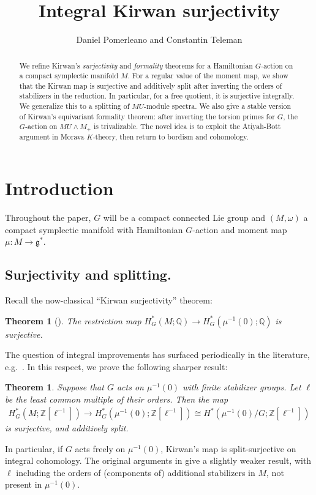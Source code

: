 \documentclass[11pt, reqno]{amsart}
\title{Integral Kirwan surjectivity}
\author{Daniel Pomerleano and Constantin Teleman}
\theoremstyle{plain}
\newtheorem{thm}{Theorem}[section]
\newtheorem*{thm*}{Theorem}
\theoremstyle{definition}
\begin{document}
\begin{abstract} We refine Kirwan's \emph{surjectivity} and \emph{formality} theorems for a Hamiltonian 
$G$-action on a compact symplectic manifold $M$. For a regular value of the 
moment map, we show that the Kirwan map is surjective and additively split after inverting the orders of 
stabilizers in the reduction.  In particular, for a free quotient, it is surjective integrally. We  generalize 
this to a splitting of $MU$-module spectra. We also give a stable version of Kirwan's equivariant formality 
theorem: after inverting the torsion primes for $G$, the $G$-action on $MU\wedge M_+$ is trivalizable. 
The novel idea is to exploit the Atiyah-Bott argument in Morava $K$-theory, then return to bordism and 
cohomology.
   \end{abstract}
\maketitle

\section{Introduction} 

Throughout the paper, $G$ will be a compact connected Lie group and $(M,\omega)$ a compact symplectic manifold 
with Hamiltonian $G$-action and moment map $\mu: M \to \mathfrak{g}^*$. 
\subsection{Surjectivity and splitting.}
Recall the now-classical ``Kirwan surjectivity'' theorem: 

\begin{thm*} [\mbox{\cite[\S5]{Kirwan}}]\label{thm:Kirwan} 
The restriction map 
$H^*_G(M; \mathbb{Q}) \to  H_G^*(\mu^{-1}(0); \mathbb{Q})$ is surjective.   
\end{thm*} 
\noindent
The question of integral improvements has surfaced periodically in the literature, e.g.~\cite{tw, aim}.
In this respect, we prove the following sharper result:

\begin{thm} \label{thm:main} 
Suppose that $G$ acts on $\mu^{-1}(0)$ with finite stabilizer groups.  Let $\ell$ be the least common multiple of 
their orders.  Then the map 
\begin{align} 
H^*_G(M; \mathbb{Z}[\ell^{-1}]) \to H_G^*(\mu^{-1}(0); \mathbb{Z}[\ell^{-1}]) \cong 
H^*(\mu^{-1}(0)/G; \mathbb{Z}[\ell^{-1}]) 
\end{align} 
is surjective, and additively split.   
\end{thm} 
\noindent
In particular,  if $G$ acts freely on $\mu^{-1}(0)$,  Kirwan's map is split-surjective on integral cohomology. 
The original arguments in \cite{Kirwan} give a slightly weaker result, with $\ell$ including the orders of 
(components of) additional stabilizers in $M$, not present in $\mu^{-1}(0)$. 
\end{document}
